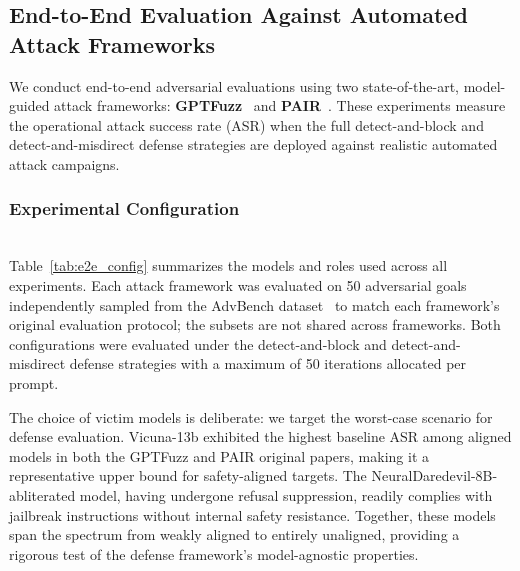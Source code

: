 \documentclass[conference,compsoc]{IEEEtran}
\begin{document}
\subsection{End-to-End Evaluation Against Automated Attack Frameworks}
\label{sec:e2e_eval}

We conduct end-to-end adversarial evaluations using two state-of-the-art, model-guided attack frameworks: \textbf{GPTFuzz}~\cite{yu2023gptfuzzer,llmfuzzer2024} and \textbf{PAIR}~\cite{pair2023}. These experiments measure the operational attack success rate (ASR) when the full detect-and-block and detect-and-misdirect defense strategies are deployed against realistic automated attack campaigns.

\subsubsection{Experimental Configuration}

\mbox{}\\[8pt]
Table~\ref{tab:e2e_config} summarizes the models and roles used across all experiments. Each attack framework was evaluated on 50 adversarial goals independently sampled from the AdvBench dataset~\cite{gcg2023} to match each framework's original evaluation protocol; the subsets are not shared across frameworks. Both configurations were evaluated under the detect-and-block and detect-and-misdirect defense strategies with a maximum of 50 iterations allocated per prompt.

The choice of victim models is deliberate: we target the worst-case scenario for defense evaluation. Vicuna-13b exhibited the highest baseline ASR among aligned models in both the GPTFuzz and PAIR original papers, making it a representative upper bound for safety-aligned targets. The NeuralDaredevil-8B-abliterated model, having undergone refusal suppression, readily complies with jailbreak instructions without internal safety resistance. Together, these models span the spectrum from weakly aligned to entirely unaligned, providing a rigorous test of the defense framework's model-agnostic properties.
\end{document}
